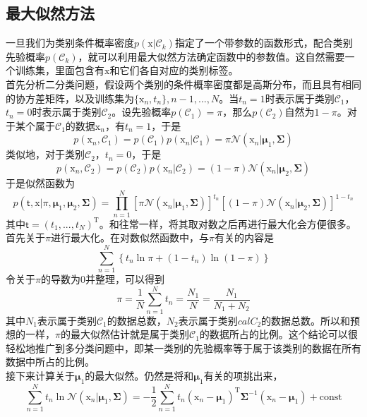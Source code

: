 \documentclass[b5paper]{book}
\numberwithin{equation}{chapter}
\newcommand {\bx} {\boldsymbol{\mathrm{x}}}
\newcommand {\sft} {\boldsymbol{\mathsf{t}}}
\newcommand {\rmT} {\mathrm{T}}
\newcommand {\bfMu} {\boldsymbol{\mu}}
\newcommand {\bfSigma} {\boldsymbol{\Sigma}}
\newcommand {\calC} {\mathcal{C}}
\begin{document}
	\subsection{最大似然方法}
	\textnormal{一旦我们为类别条件概率密度$p(\bx|\calC_k)$指定了一个带参数的函数形式，配合类别先验概率$p(\calC_k)$，就可以利用最大似然方法确定函数中的参数值。这自然需要一个训练集，里面包含有$\bx$和它们各自对应的类别标签。\\
	\indent 首先分析二分类问题，假设两个类别的条件概率密度都是高斯分布，而且具有相同的协方差矩阵，以及训练集为$\{\bx_n, t_n\}, n-1,...,N$。当$t_n = 1$时表示属于类别$\calC_1$，$t_n = 0$时表示属于类别$\calC_2$。设先验概率$p(\calC_1) = \pi$，那么$p(\calC_2)$自然为$1-\pi$。对于某个属于$\calC_1$的数据$\bx_n$，有$t_n = 1$，于是
	\begin{equation*}
		p(\bx_n, \calC_1) = p(\calC_1)p(\bx_n|\calC_1) = \pi \mathcal{N}(\bx_n|\bfMu_1, \bfSigma)
	\end{equation*}
	类似地，对于类别$\calC_2$，$t_n = 0$，于是
	\begin{equation*}
		p(\bx_n, \calC_2) = p(\calC_2)p(\bx_n|\calC_2) = (1 - \pi)\mathcal{N}(\bx_n|\bfMu_2,\bfSigma)
	\end{equation*}
	于是似然函数为
	\begin{equation}
		p(\sft, \bx|\pi, \bfMu_1, \bfMu_2, \bfSigma) = \prod_{n=1}^N \left[\pi \mathcal{N}(\bx_n|\bfMu_1, \bfSigma)\right]^{t_n} \left[(1-\pi)\mathcal{N}(\bx_n|\bfMu_2,\bfSigma)\right]^{1-t_n}
	\end{equation}
	其中$\sft = (t_1, ...,t_N)^{\rmT}$。和往常一样，将其取对数之后再进行最大化会方便很多。首先关于$\pi$进行最大化。在对数似然函数中，与$\pi$有关的内容是
	\begin{equation}
		\sum_{n=1}^N \left\{t_n \ln \pi + (1-t_n)\ln (1-\pi)\right\}
	\end{equation}
	令关于$\pi$的导数为0并整理，可以得到
	\begin{equation}
		\pi = \frac{1}{N}\sum_{n=1}^N t_n = \frac{N_1}{N} = \frac{N_1}{N_1 + N_2}
	\end{equation}
	其中$N_1$表示属于类别$\calC_1$的数据总数，$N_2$表示属于类别$calC_2$的数据总数。所以和预想的一样，$\pi$的最大似然估计就是属于类别$\calC_1$的数据所占的比例。这个结论可以很轻松地推广到多分类问题中，即某一类别的先验概率等于属于该类别的数据在所有数据中所占的比例。\\
	\indent 接下来计算关于$\bfMu_1$的最大似然。仍然是将和$\bfMu_1$有关的项挑出来，
	\begin{equation}
		\sum_{n=1}^N t_n \ln \mathcal{N}(\bx_n|\bfMu_1, \bfSigma) = -\frac{1}{2}\sum_{n=1}^N t_n(\bx_n - \bfMu_1)^{\rmT}\bfSigma^{-1}(\bx_n-\bfMu_1) + \mathrm{const}

\end{equation}}
\end{document}
